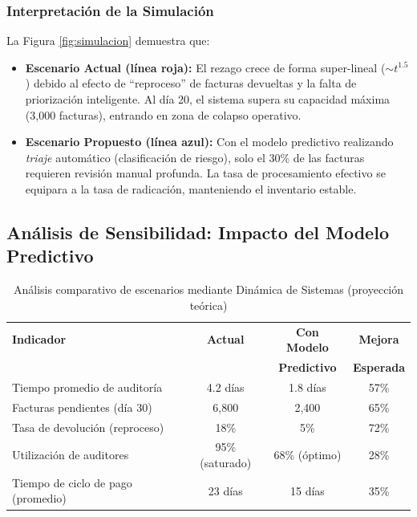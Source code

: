 \documentclass[12pt,letterpaper]{report}
\begin{document}
\subsubsection{Interpretación de la Simulación}

La Figura \ref{fig:simulacion} demuestra que:

\begin{itemize}
    \item \textbf{Escenario Actual (línea roja):} El rezago crece de forma super-lineal ($\sim t^{1.5}$) debido al efecto de ``reproceso'' de facturas devueltas y la falta de priorización inteligente. Al día 20, el sistema supera su capacidad máxima (3,000 facturas), entrando en zona de colapso operativo.
    
    \item \textbf{Escenario Propuesto (línea azul):} Con el modelo predictivo realizando \textit{triaje} automático (clasificación de riesgo), solo el 30\% de las facturas requieren revisión manual profunda. La tasa de procesamiento efectivo se equipara a la tasa de radicación, manteniendo el inventario estable.
\end{itemize}

\subsection{Análisis de Sensibilidad: Impacto del Modelo Predictivo}

\begin{table}[H]
\centering
\caption{Análisis comparativo de escenarios mediante Dinámica de Sistemas (proyección teórica)}
\label{tab:escenarios_sd}
\small
\begin{tabular}{@{}lccc@{}}
\toprule
\textbf{Indicador} & \textbf{Actual} & \textbf{Con Modelo} & \textbf{Mejora} \\
                   &                 & \textbf{Predictivo} & \textbf{Esperada} \\
\midrule
Tiempo promedio de auditoría & 4.2 días & 1.8 días & 57\% \\
Facturas pendientes (día 30) & 6,800 & 2,400 & 65\% \\
Tasa de devolución (reproceso) & 18\% & 5\% & 72\% \\
Utilización de auditores & 95\% (saturado) & 68\% (óptimo) & 28\% \\
Tiempo de ciclo de pago (promedio) & 23 días & 15 días & 35\% \\
\bottomrule
\end{tabular}
\end{table}
\end{document}
